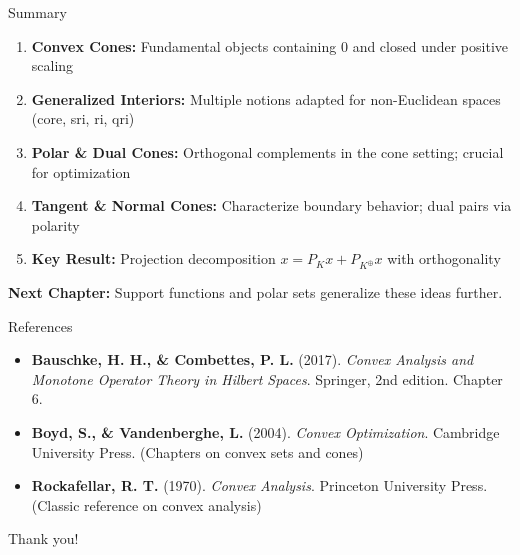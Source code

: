 \documentclass[aspectratio=169,10pt]{beamer}
\begin{document}
\begin{frame}{Summary}
\begin{enumerate}
    \item \textbf{Convex Cones:} Fundamental objects containing $0$ and closed under positive scaling

    \item \textbf{Generalized Interiors:} Multiple notions adapted for non-Euclidean spaces (core, sri, ri, qri)

    \item \textbf{Polar \& Dual Cones:} Orthogonal complements in the cone setting; crucial for optimization

    \item \textbf{Tangent \& Normal Cones:} Characterize boundary behavior; dual pairs via polarity

    \item \textbf{Key Result:} Projection decomposition $x = P_K x + P_{K^{\oplus}} x$ with orthogonality
\end{enumerate}

\vspace{0.5cm}

\textbf{Next Chapter:} Support functions and polar sets generalize these ideas further.
\end{frame}

\begin{frame}{References}
\begin{itemize}
    \item \textbf{Bauschke, H. H., \& Combettes, P. L.} (2017).
    \textit{Convex Analysis and Monotone Operator Theory in Hilbert Spaces}.
    Springer, 2nd edition. Chapter 6.

    \item \textbf{Boyd, S., \& Vandenberghe, L.} (2004).
    \textit{Convex Optimization}. Cambridge University Press.
    (Chapters on convex sets and cones)

    \item \textbf{Rockafellar, R. T.} (1970).
    \textit{Convex Analysis}. Princeton University Press.
    (Classic reference on convex analysis)
\end{itemize}

\vspace{0.5cm}

\centerline{\Large Thank you!}
\end{frame}
\end{document}
